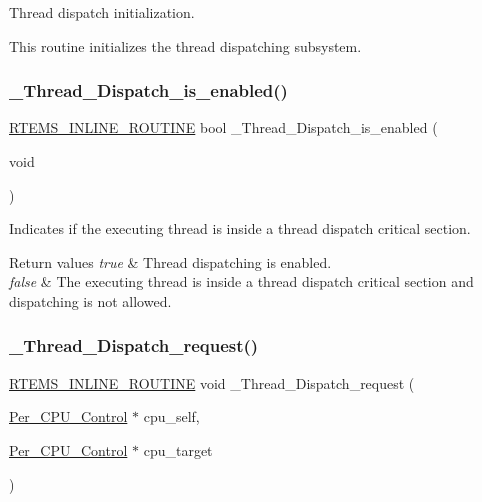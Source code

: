 Thread dispatch initialization. 

This routine initializes the thread dispatching subsystem. \mbox{\label{group__RTEMSScoreThread_gaa847ae7c8e3c4cf3f3f3f082124eac8e}} 
\subsubsection{\texorpdfstring{\_Thread\_Dispatch\_is\_enabled()}{\_Thread\_Dispatch\_is\_enabled()}}
{\footnotesize\ttfamily \mbox{\hyperlink{group__RTEMSScoreBaseDefs_gac216239df231d5dbd15e3520b0b9313f}{R\+T\+E\+M\+S\+\_\+\+I\+N\+L\+I\+N\+E\+\_\+\+R\+O\+U\+T\+I\+NE}} bool \+\_\+\+Thread\+\_\+\+Dispatch\+\_\+is\+\_\+enabled (\begin{DoxyParamCaption}\item[{void}]{ }\end{DoxyParamCaption})}



Indicates if the executing thread is inside a thread dispatch critical section. 


\begin{DoxyRetVals}{Return values}
{\em true} & Thread dispatching is enabled. \\
\hline
{\em false} & The executing thread is inside a thread dispatch critical section and dispatching is not allowed. \\
\hline
\end{DoxyRetVals}
\mbox{\label{group__RTEMSScoreThread_ga216a6330c178a36afc4eb50a4a66ba4a}} 
\subsubsection{\texorpdfstring{\_Thread\_Dispatch\_request()}{\_Thread\_Dispatch\_request()}}
{\footnotesize\ttfamily \mbox{\hyperlink{group__RTEMSScoreBaseDefs_gac216239df231d5dbd15e3520b0b9313f}{R\+T\+E\+M\+S\+\_\+\+I\+N\+L\+I\+N\+E\+\_\+\+R\+O\+U\+T\+I\+NE}} void \+\_\+\+Thread\+\_\+\+Dispatch\+\_\+request (\begin{DoxyParamCaption}\item[{\mbox{\hyperlink{structPer__CPU__Control}{Per\+\_\+\+C\+P\+U\+\_\+\+Control}} $\ast$}]{cpu\+\_\+self,  }\item[{\mbox{\hyperlink{structPer__CPU__Control}{Per\+\_\+\+C\+P\+U\+\_\+\+Control}} $\ast$}]{cpu\+\_\+target }\end{DoxyParamCaption})}



